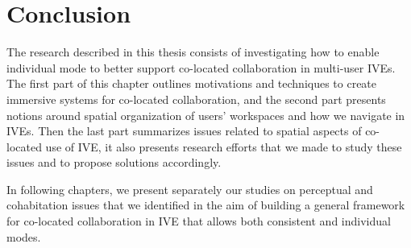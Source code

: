 
\section{Conclusion}
The research described in this thesis consists of investigating how to enable individual mode to better support co-located collaboration in multi-user IVEs. The first part of this chapter outlines motivations and techniques to create immersive systems for co-located collaboration, and the second part presents notions around spatial organization of users' workspaces and how we navigate in IVEs. Then the last part summarizes issues related to spatial aspects of co-located use of IVE, it also presents research efforts that we made to study these issues and to propose solutions accordingly.

In following chapters, we present separately our studies on perceptual and cohabitation issues that we identified in the aim of building a general framework for co-located collaboration in IVE that allows both consistent and individual modes.